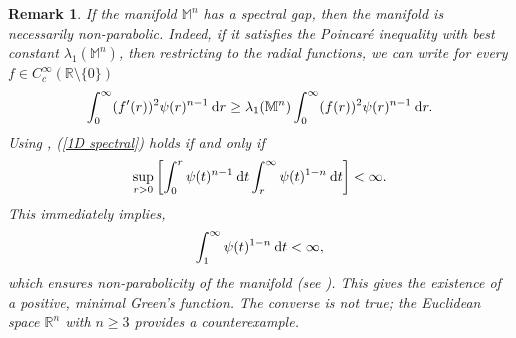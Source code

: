 \documentclass[a4paper,11pt,reqno]{amsart}
\renewcommand\eqref[1]{(\ref{#1})}
\theoremstyle{plain}
\newtheorem{remark}{Remark}[section]
\numberwithin{equation}{section} \allowdisplaybreaks
\newcommand{\m}{\mathbb{M}^n}
\newcommand{\dt}{\:{\rm d}t}
\newcommand{\dr}{\:{\rm d}r}
\begin{document}
\medskip

\begin{remark}
\rm
    If the manifold $\m$ has a spectral gap, then the manifold is necessarily non-parabolic. Indeed, if it satisfies the Poincaré inequality with best constant $\lambda_1(\m)$, then restricting to the radial functions, we can write for every $f \in C_c^{\infty}(\mathbb{R}\setminus \{0\})$
    \begin{equation}\label{1D spectral}
        \int_0^{\infty} (f'(r))^2\psi(r)^{n-1}\dr \geq \lambda_1(\m)\int_0^{\infty} (f(r))^2\psi(r)^{n-1}\dr.
    \end{equation}
    Using \cite[Theorem~2, section~1.3, Chapter~1]{Mazja}, \eqref{1D spectral} holds if and only if
    \begin{equation*}
        \sup_{r>0}\left[\int_0^r \psi(t)^{n-1}\dt\int_r^{\infty}\psi(t)^{1-n}\dt\right]<\infty.
    \end{equation*}
    This immediately implies,
    \begin{equation*}
        \int_1^{\infty}\psi(t)^{1-n}\dt<\infty,
    \end{equation*}
    which ensures non-parabolicity of the manifold (see \cite[Proposition~3.1]{grigo}). This gives the existence of a positive, minimal Green's function. The converse is not true; the Euclidean space $\mathbb{R}^n$ with $n \geq 3$ provides a counterexample.\rm
\end{remark}

\medskip
\end{document}
